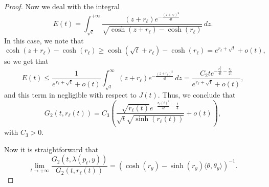 \documentclass[12pt,longbibliography]{article}
\theoremstyle{definition}
\theoremstyle{remark}
\theoremstyle{example}
\begin{document}
\begin{proof}
	Now we deal with the integral
	\[
	E(t) = \int_{\sqrt{t}}^{+\infty} \frac{(z+r_\ell) e^{-\frac{(z+r_\ell)^2}{4 t}}}{\sqrt{\cosh (z+r_\ell) -\cosh (r_\ell)}} \, dz.
	\]
	In this case, we note that
	\[
	\cosh (z+r_\ell)-\cosh (r_\ell) \geq \cosh (\sqrt{t}+r_\ell)-\cosh (r_\ell) = e^{r_\ell+\sqrt{t}}+ o(t),
	\]
	so we get that
	\[
	E(t) \leq \frac{1}{e^{r_\ell+\sqrt{t}}+o(t)} \int_{\sqrt{t}}^{\infty} (z+r_\ell) e^{-\frac{(z+r_\ell)^2}{4 t}}\, dz = \frac{C_2 t e^{-\frac{r_\ell^2}{4t}-\frac{r_\ell}{2 t}}}{e^{r_\ell+\sqrt{t}}+o(t)},
	\]
	and this term in negligible with respect to $J(t)$. Thus, we conclude that
	\[
	G_2 (t, r_\ell (t)) = C_3\left(\frac{\sqrt{r_\ell (t)} e^{-\frac{r_\ell(t)^2}{4t}-\frac{t}{4}}}{ \sqrt{t}\sqrt{\sinh (r_\ell (t))}}+ o(t)\right),
	\]
	with $C_3>0$. 
	
	Now it is straightforward that
	\[
	\displaystyle\lim_{t \to +\infty} \frac{G_2 (t,\lambda(p_t, y))}{G_2 (t,r_\ell (t))} = (\cosh (r_y)-\sinh (r_y) \langle\theta,\theta_y\rangle)^{-1}.
	\]
	

\end{proof}
\end{document}
